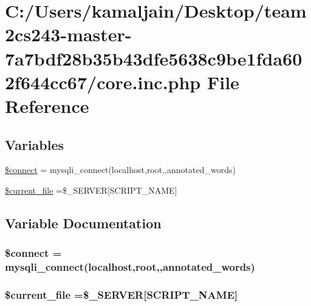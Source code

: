 \hypertarget{core_8inc_8php}{}\section{C\+:/\+Users/kamaljain/\+Desktop/team2cs243-\/master-\/7a7bdf28b35b43dfe5638c9be1fda602f644cc67/core.inc.\+php File Reference}
\label{core_8inc_8php}
\subsection*{Variables}
\begin{DoxyCompactItemize}
\item 
\hyperlink{core_8inc_8php_a956617395b85e98d907df712f6d0d3f7}{\$connect} = mysqli\+\_\+connect(\textquotesingle{}localhost\textquotesingle{},\textquotesingle{}root\textquotesingle{},\textquotesingle{}\textquotesingle{},\textquotesingle{}annotated\+\_\+words\textquotesingle{})
\item 
\hyperlink{core_8inc_8php_a89c8dde1a6e088adf4b6955a1bc2d2a1}{\$current\+\_\+file} =\$\+\_\+\+S\+E\+R\+V\+ER\mbox{[}\textquotesingle{}S\+C\+R\+I\+P\+T\+\_\+\+N\+A\+ME\textquotesingle{}\mbox{]}
\end{DoxyCompactItemize}


\subsection{Variable Documentation}
\subsubsection[{\texorpdfstring{\$connect}{$connect}}]{\setlength{\rightskip}{0pt plus 5cm}\$connect = mysqli\+\_\+connect(\textquotesingle{}localhost\textquotesingle{},\textquotesingle{}root\textquotesingle{},\textquotesingle{}\textquotesingle{},\textquotesingle{}annotated\+\_\+words\textquotesingle{})}\hypertarget{core_8inc_8php_a956617395b85e98d907df712f6d0d3f7}{}\label{core_8inc_8php_a956617395b85e98d907df712f6d0d3f7}
\subsubsection[{\texorpdfstring{\$current\+\_\+file}{$current_file}}]{\setlength{\rightskip}{0pt plus 5cm}\$current\+\_\+file =\$\+\_\+\+S\+E\+R\+V\+ER\mbox{[}\textquotesingle{}S\+C\+R\+I\+P\+T\+\_\+\+N\+A\+ME\textquotesingle{}\mbox{]}}\hypertarget{core_8inc_8php_a89c8dde1a6e088adf4b6955a1bc2d2a1}{}\label{core_8inc_8php_a89c8dde1a6e088adf4b6955a1bc2d2a1}
